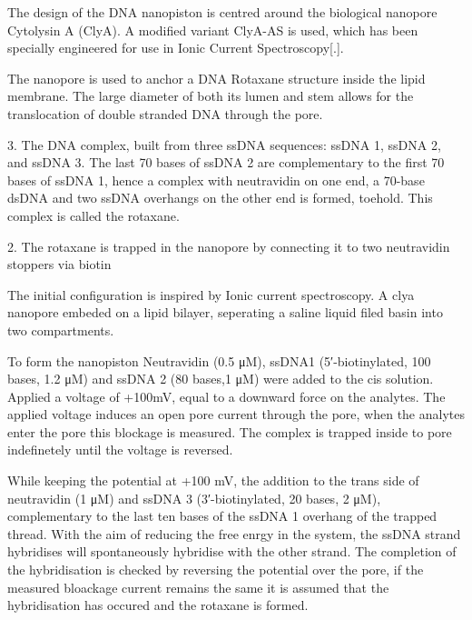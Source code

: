 The design of the DNA nanopiston is centred around the biological nanopore Cytolysin
A (ClyA). A modified variant ClyA-AS is used, which has been specially engineered for
use in Ionic Current Spectroscopy[.].


The nanopore is used to anchor a DNA Rotaxane structure inside the lipid membrane. The
large diameter of both its lumen and stem allows for the translocation of double
stranded DNA through the pore.



3. The DNA complex, built from three ssDNA sequences: ssDNA 1, ssDNA 2, and ssDNA 3.  The
last 70 bases of ssDNA 2 are complementary to the first 70 bases of ssDNA 1,  hence a
complex with neutravidin on one end, a 70-base dsDNA and two ssDNA overhangs on the other
end is formed, toehold. This complex is called the rotaxane.

2. The rotaxane is trapped in the nanopore by connecting it to two neutravidin stoppers
via biotin

The initial configuration is inspired by Ionic current spectroscopy. A clya nanopore
embeded on a lipid bilayer, seperating a saline liquid filed basin into two compartments.

To form the nanopiston Neutravidin (0.5 μM), ssDNA1 (5′-biotinylated, 100 bases, 1.2 μM)
and ssDNA 2 (80 bases,1 μM) were added to the cis solution. Applied a voltage of +100mV,
equal to a downward force on the analytes. The applied voltage induces an open pore
current through the pore, when the analytes enter the pore this blockage is measured.
The complex is trapped inside to pore indefinetely until the voltage is reversed.

While keeping the potential at +100 mV, the addition to the trans side of neutravidin (1
μM) and ssDNA 3 (3′-biotinylated, 20 bases, 2 μM), complementary to the last ten bases of
the ssDNA 1 overhang of the trapped thread. With the aim of reducing the free enrgy in
the system, the ssDNA strand hybridises will spontaneously hybridise with the other
strand. The completion of the hybridisation is checked by reversing the potential over
the pore, if the measured bloackage current remains the same it is assumed that the
hybridisation has occured and the rotaxane is formed.


